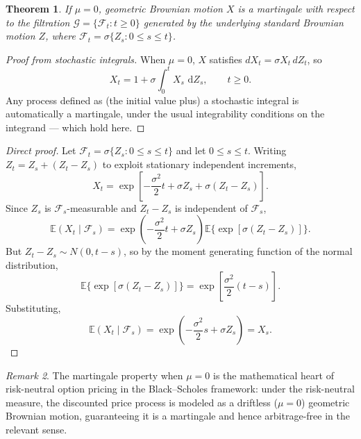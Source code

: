 \documentclass[12pt,openany]{book}
\newtheorem{theorem}{Theorem}[section]
\theoremstyle{definition}
\theoremstyle{remark}
\newtheorem{remark}[theorem]{Remark}
\newcommand{\E}{\mathbb{E}}
\newcommand{\Fscr}{\mathcal{F}}
\newcommand{\Gscr}{\mathcal{G}}
\newcommand{\dd}{\,\mathrm{d}}
\begin{document}
\begin{theorem}
If $\mu=0$, geometric Brownian motion $X$ is a martingale with respect to the filtration $\Gscr = \{\Fscr_t : t\ge0\}$ generated by the underlying standard Brownian motion $Z$, where $\Fscr_t=\sigma\{Z_s : 0\le s\le t\}$.
\end{theorem}
 
\begin{proof}[Proof from stochastic integrals]
When $\mu=0$, $X$ satisfies $dX_t = \sigma X_t\,dZ_t$, so
\begin{equation}
    X_t = 1+\sigma\int_0^t X_s\,\dd Z_s, \qquad t\ge0. \tag{18.4.8}
\end{equation}
Any process defined as (the initial value plus) a stochastic integral is automatically a martingale, under the usual integrability conditions on the integrand — which hold here.
\end{proof}
 
\begin{proof}[Direct proof]
Let $\Fscr_t=\sigma\{Z_s:0\le s\le t\}$ and let $0\le s\le t$. Writing $Z_t=Z_s+(Z_t-Z_s)$ to exploit stationary independent increments,
\begin{equation}
    X_t = \exp\!\left[-\frac{\sigma^2}{2}t + \sigma Z_s + \sigma(Z_t-Z_s)\right]. \tag{18.4.9}
\end{equation}
Since $Z_s$ is $\Fscr_s$-measurable and $Z_t-Z_s$ is independent of $\Fscr_s$,
\begin{equation}
    \E(X_t\mid\Fscr_s) = \exp\!\left(-\frac{\sigma^2}{2}t+\sigma Z_s\right)\E\{\exp[\sigma(Z_t-Z_s)]\}. \tag{18.4.10}
\end{equation}
But $Z_t-Z_s\sim N(0,t-s)$, so by the moment generating function of the normal distribution,
\begin{equation}
    \E\{\exp[\sigma(Z_t-Z_s)]\} = \exp\!\left[\frac{\sigma^2}{2}(t-s)\right]. \tag{18.4.11}
\end{equation}
Substituting,
\begin{equation}
    \E(X_t\mid\Fscr_s) = \exp\!\left(-\frac{\sigma^2}{2}s+\sigma Z_s\right) = X_s. \tag{18.4.12}
\end{equation}
\end{proof}
 
\begin{remark}
The martingale property when $\mu=0$ is the mathematical heart of risk-neutral option pricing in the Black--Scholes framework: under the risk-neutral measure, the discounted price process is modeled as a driftless ($\mu=0$) geometric Brownian motion, guaranteeing it is a martingale and hence arbitrage-free in the relevant sense.
\end{remark}
\end{document}
